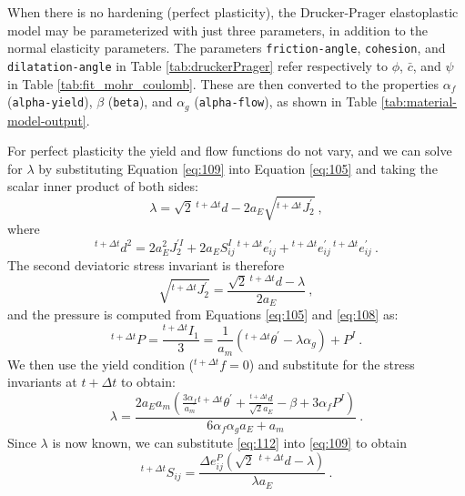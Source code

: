 When there is no hardening (perfect plasticity), the Drucker-Prager
elastoplastic model may be parameterized with just three parameters,
in addition to the normal elasticity parameters. The parameters \texttt{friction-angle},
\texttt{cohesion}, and \texttt{dilatation-angle} in Table \ref{tab:druckerPrager}
refer respectively to $\phi$, $\bar{c}$, and $\psi$ in Table \ref{tab:fit_mohr_coulomb}.
These are then converted to the properties $\alpha_{f}$ (\texttt{alpha-yield}),
$\beta$ (\texttt{beta}), and $\alpha_{g}$ (\texttt{alpha-flow}),
as shown in Table \ref{tab:material-model-output}.

For perfect plasticity the yield and flow functions do not vary, and
we can solve for $\lambda$ by substituting Equation \ref{eq:109}
into Equation \ref{eq:105} and taking the scalar inner product of
both sides:
\begin{equation}
\lambda=\sqrt{2}\,\phantom{}^{t+\Delta t}d-2a_{E}\sqrt{^{t+\Delta t}J_{2}^{\prime}}\:,\label{eq:110}
\end{equation}
where
\begin{equation}
^{t+\Delta t}d^{2}=2a_{E}^{2}J_{2}^{\prime I}+2a_{E}S_{ij}^{I}\,\phantom{}^{t+\Delta t}e_{ij}^{\prime}+\phantom{}^{t+\Delta t}e_{ij}^{\prime}\,\phantom{}^{t+\Delta t}e_{ij}^{\prime}\:.\label{eq:111}
\end{equation}
The second deviatoric stress invariant is therefore
\begin{equation}
\sqrt{^{t+\Delta t}J_{2}^{\prime}}=\frac{\sqrt{2}\,\phantom{}^{t+\Delta t}d-\lambda}{2a_{E}}\:,\label{eq:112}
\end{equation}
and the pressure is computed from Equations \ref{eq:105} and \ref{eq:108}
as:
\begin{equation}
^{t+\Delta t}P=\frac{^{t+\Delta t}I_{1}}{3}=\frac{1}{a_{m}}\left(^{t+\Delta t}\theta^{\prime}-\lambda\alpha_{g}\right)+P^{I}\:.\label{eq:113}
\end{equation}
We then use the yield condition ($^{t+\Delta t}f=0$) and substitute
for the stress invariants at $t+\Delta t$ to obtain:
\begin{equation}
\lambda=\frac{2a_{E}a_{m}\left(\frac{3\alpha_{f}}{a_{m}}\phantom{}^{t+\Delta t}\theta^{\prime}+\frac{^{t+\Delta t}d}{\sqrt{2}a_{E}}-\beta+3\alpha_{f}P^{I}\right)}{6\alpha_{f}\alpha_{g}a_{E}+a_{m}}\:.\label{eq:114}
\end{equation}
Since $\lambda$ is now known, we can substitute \ref{eq:112} into
\ref{eq:109} to obtain
\begin{equation}
^{t+\Delta t}S_{ij}=\frac{\Delta e_{ij}^{P}\left(\sqrt{2}\,\phantom{\,}^{t+\Delta t}d-\lambda\right)}{\lambda a_{E}}\:.\label{eq:115}
\end{equation}
